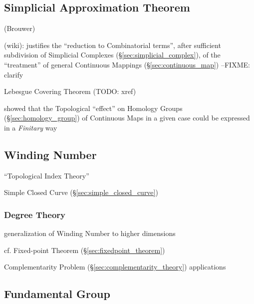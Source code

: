 \subsection{Simplicial Approximation Theorem}
\label{sec:simplicial_approximation_theorem}

(Brouwer)

(wiki): justifies the ``reduction to Combinatorial terms'', after sufficient
subdivision of Simplicial Complexes (\S\ref{sec:simplicial_complex}), of the
``treatment'' of general Continuous Mappings (\S\ref{sec:continuous_map})
--FIXME: clarify

Lebesgue Covering Theorem (TODO: xref)

showed that the Topological ``effect'' on Homology Groups
(\S\ref{sec:homology_group}) of Continuous Maps in a given case could be
expressed in a \emph{Finitary} way



\subsection{Winding Number}\label{sec:winding_number}

``Topological Index Theory''

Simple Closed Curve (\S\ref{sec:simple_closed_curve})



\subsubsection{Degree Theory}\label{sec:degree_theory}

generalization of Winding Number to higher dimensions

cf. Fixed-point Theorem (\S\ref{sec:fixedpoint_theorem})

Complementarity Problem (\S\ref{sec:complementarity_theory}) applications



\subsection{Fundamental Group}\label{sec:fundamental_group}

